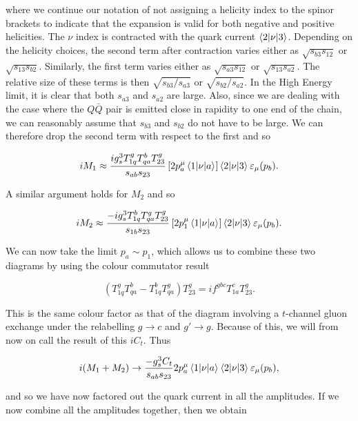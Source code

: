 where we continue our notation of not assigning a helicity index to the spinor brackets to indicate that the expansion is valid for both negative and positive helicities. The $\nu$ index is contracted with the quark current $\mathinner{\langle2\vert\nu\vert3\rangle}_{}$. Depending on the helicity choices, the second term after contraction varies either as $\sqrt{s_{b3} s_{12}}$ or $\sqrt{s_{13} s_{b2}}$. Similarly, the first term varies either as $\sqrt{s_{a3} s_{12}}$ or $\sqrt{s_{13} s_{a2}}$. The relative size of these terms is then $\sqrt{s_{b3}/s_{a3}}$ or $\sqrt{s_{b2}/s_{a2}}$. In the High Energy limit, it is clear that both $s_{a3}$ and $s_{a2}$ are large. Also, since we are dealing with the case where the $Q\bar{Q}$ pair is emitted close in rapidity to one end of the chain, we can reasonably assume that $s_{b3}$ and $s_{b2}$ do not have to be large. We can therefore drop the second term with respect to the first and so

\begin{equation}
iM_1 \approx \frac{i g_s^3 T^g_{1q}T^b_{qa}T^g_{23}}{s_{ab}s_{23}} \left[ 2p_a^\mu \mathinner{\langle1\vert\nu\vert a\rangle}_{} \right] \mathinner{\langle2\vert\nu\vert3\rangle}_{} \varepsilon_\mu (p_b).
\end{equation}

A similar argument holds for $M_2$ and so

\begin{equation}
iM_2 \approx \frac{-i g_s^3 T^b_{1q}T^g_{qa}T^g_{23}}{s_{1b}s_{23}} \left[ 2p_1^\mu \mathinner{\langle1\vert\nu\vert a\rangle}_{} \right] \mathinner{\langle2\vert\nu\vert3\rangle}_{} \varepsilon_\mu (p_b).
\end{equation}

We can now take the limit $p_a \sim p_1$, which allows us to combine these two diagrams by using the colour commutator result

\begin{equation}
(T^g_{1q}T^b_{qa}- T^b_{1q}T^g_{qa})T^g_{23} = i f^{gbc}T^c_{1a}T^g_{23}.
\end{equation}

This is the same colour factor as that of the diagram involving a $t$-channel gluon exchange under the relabelling $g \to c$ and $g' \to g$. Because of this, we will from now on call the result of this $i C_t$. Thus

\begin{equation}
i(M_1 + M_2) \to \frac{- g_s^3 C_t}{s_{ab}s_{23}}2p_a^\mu \mathinner{\langle1\vert\nu\vert a\rangle}_{} \mathinner{\langle2\vert\nu\vert3\rangle}_{} \varepsilon_\mu (p_b),
\end{equation}

and so we have now factored out the quark current in all the amplitudes. If we now combine all the amplitudes together, then we obtain

